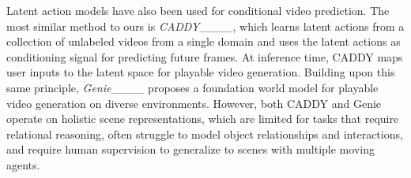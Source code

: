 Latent action models have also been used for conditional video prediction.
%
The most similar method to ours is \emph{CADDY}____, which learns latent actions from a collection of unlabeled videos from a single domain and uses the latent actions as conditioning signal for predicting future frames.
%
At inference time, CADDY maps user inputs to the latent space for playable video generation.
%
Building upon this same principle, \emph{Genie}____ proposes a foundation world model for playable video generation on diverse environments.
%
However, both CADDY and Genie operate on holistic scene representations, which are limited for tasks that require relational reasoning, often struggle to model object relationships and interactions, and require human supervision to generalize to scenes with multiple moving agents.









